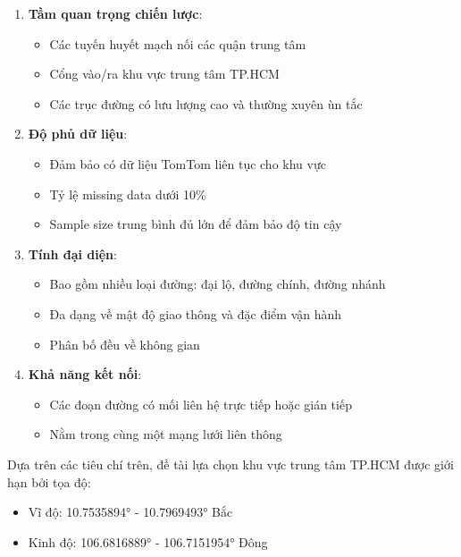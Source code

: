 \begin{enumerate}
    \item \textbf{Tầm quan trọng chiến lược}:
    \begin{itemize}
        \item Các tuyến huyết mạch nối các quận trung tâm
        \item Cổng vào/ra khu vực trung tâm TP.HCM
        \item Các trục đường có lưu lượng cao và thường xuyên ùn tắc
    \end{itemize}
    
    \item \textbf{Độ phủ dữ liệu}:
    \begin{itemize}
        \item Đảm bảo có dữ liệu TomTom liên tục cho khu vực
        \item Tỷ lệ missing data dưới 10\%
        \item Sample size trung bình đủ lớn để đảm bảo độ tin cậy
    \end{itemize}
    
    \item \textbf{Tính đại diện}:
    \begin{itemize}
        \item Bao gồm nhiều loại đường: đại lộ, đường chính, đường nhánh
        \item Đa dạng về mật độ giao thông và đặc điểm vận hành
        \item Phân bố đều về không gian
    \end{itemize}
    
    \item \textbf{Khả năng kết nối}:
    \begin{itemize}
        \item Các đoạn đường có mối liên hệ trực tiếp hoặc gián tiếp
        \item Nằm trong cùng một mạng lưới liên thông
    \end{itemize}
\end{enumerate}


Dựa trên các tiêu chí trên, đề tài lựa chọn khu vực trung tâm TP.HCM được giới hạn bởi tọa độ:

\begin{itemize}
    \item Vĩ độ: 10.7535894° - 10.7969493° Bắc
    \item Kinh độ: 106.6816889° - 106.7151954° Đông
\end{itemize}

